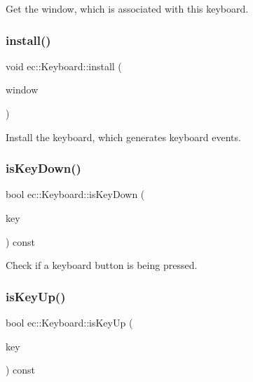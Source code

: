 Get the window, which is associated with this keyboard. \mbox{\label{classec_1_1_keyboard_af792a3b8226096510f6dfecc57697f8e}} 
\subsubsection{\texorpdfstring{install()}{install()}}
{\footnotesize\ttfamily void ec\+::\+Keyboard\+::install (\begin{DoxyParamCaption}\item[{\mbox{\hyperlink{classec_1_1_window}{Window}} $\ast$}]{window }\end{DoxyParamCaption})}

Install the keyboard, which generates keyboard events. \mbox{\label{classec_1_1_keyboard_a47779c0842584eb4337e1aa63e7d7a35}} 
\subsubsection{\texorpdfstring{is\+Key\+Down()}{isKeyDown()}}
{\footnotesize\ttfamily bool ec\+::\+Keyboard\+::is\+Key\+Down (\begin{DoxyParamCaption}\item[{\mbox{\hyperlink{classec_1_1_keyboard_a135ca08df15aebf8c93ce3cc76288a6e}{Keyboard\+::\+E\+C\+\_\+\+K\+E\+Y\+\_\+\+K\+E\+Y\+B\+O\+A\+RD}}}]{key }\end{DoxyParamCaption}) const}

Check if a keyboard button is being pressed. \mbox{\label{classec_1_1_keyboard_a0d260eb1df363be405af8a967aa8b5b6}} 
\subsubsection{\texorpdfstring{is\+Key\+Up()}{isKeyUp()}}
{\footnotesize\ttfamily bool ec\+::\+Keyboard\+::is\+Key\+Up (\begin{DoxyParamCaption}\item[{\mbox{\hyperlink{classec_1_1_keyboard_a135ca08df15aebf8c93ce3cc76288a6e}{Keyboard\+::\+E\+C\+\_\+\+K\+E\+Y\+\_\+\+K\+E\+Y\+B\+O\+A\+RD}}}]{key }\end{DoxyParamCaption}) const}

